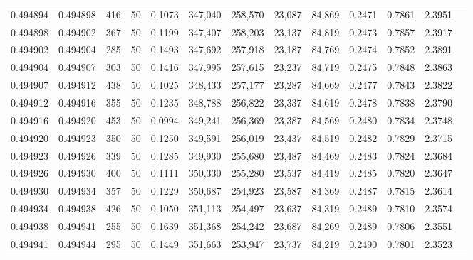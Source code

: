 \begin{tabular}{rrrrrrrrrrrrr}
0.494894 & 0.494898 &   416 &  50 &                                     0.1073 & 347,040 & 258,570 &  23,087 &  84,869 & 0.2471 & 0.7861 & 2.3951 \\
0.494898 & 0.494902 &   367 &  50 &                                     0.1199 & 347,407 & 258,203 &  23,137 &  84,819 & 0.2473 & 0.7857 & 2.3917 \\
0.494902 & 0.494904 &   285 &  50 &                                     0.1493 & 347,692 & 257,918 &  23,187 &  84,769 & 0.2474 & 0.7852 & 2.3891 \\
0.494904 & 0.494907 &   303 &  50 &                                     0.1416 & 347,995 & 257,615 &  23,237 &  84,719 & 0.2475 & 0.7848 & 2.3863 \\
0.494907 & 0.494912 &   438 &  50 &                                     0.1025 & 348,433 & 257,177 &  23,287 &  84,669 & 0.2477 & 0.7843 & 2.3822 \\
0.494912 & 0.494916 &   355 &  50 &                                     0.1235 & 348,788 & 256,822 &  23,337 &  84,619 & 0.2478 & 0.7838 & 2.3790 \\
0.494916 & 0.494920 &   453 &  50 &                                     0.0994 & 349,241 & 256,369 &  23,387 &  84,569 & 0.2480 & 0.7834 & 2.3748 \\
0.494920 & 0.494923 &   350 &  50 &                                     0.1250 & 349,591 & 256,019 &  23,437 &  84,519 & 0.2482 & 0.7829 & 2.3715 \\
0.494923 & 0.494926 &   339 &  50 &                                     0.1285 & 349,930 & 255,680 &  23,487 &  84,469 & 0.2483 & 0.7824 & 2.3684 \\
0.494926 & 0.494930 &   400 &  50 &                                     0.1111 & 350,330 & 255,280 &  23,537 &  84,419 & 0.2485 & 0.7820 & 2.3647 \\
0.494930 & 0.494934 &   357 &  50 &                                     0.1229 & 350,687 & 254,923 &  23,587 &  84,369 & 0.2487 & 0.7815 & 2.3614 \\
0.494934 & 0.494938 &   426 &  50 &                                     0.1050 & 351,113 & 254,497 &  23,637 &  84,319 & 0.2489 & 0.7810 & 2.3574 \\
0.494938 & 0.494941 &   255 &  50 &                                     0.1639 & 351,368 & 254,242 &  23,687 &  84,269 & 0.2489 & 0.7806 & 2.3551 \\
0.494941 & 0.494944 &   295 &  50 &                                     0.1449 & 351,663 & 253,947 &  23,737 &  84,219 & 0.2490 & 0.7801 & 2.3523 \\

\end{tabular}
